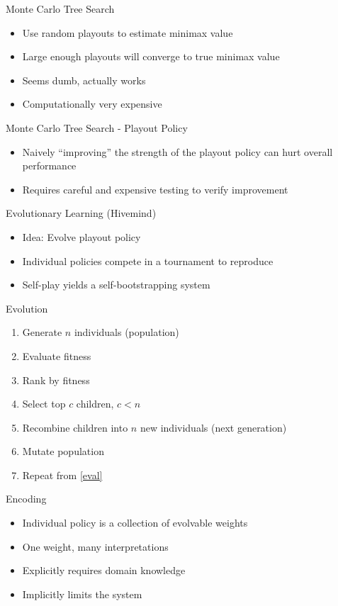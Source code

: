 \documentclass{beamer}
\begin{document}
\begin{frame}{Monte Carlo Tree Search}
\begin{itemize}
	\item Use random playouts to estimate minimax value
	\item Large enough playouts will converge to true minimax value
	\item Seems dumb, actually works
	\item Computationally very expensive
\end{itemize}
\end{frame}

\begin{frame}{Monte Carlo Tree Search - Playout Policy}
\begin{itemize}
	\item Naively ``improving'' the strength of the playout policy can hurt overall performance
	\item Requires careful and expensive testing to verify improvement
\end{itemize}
\end{frame}

\begin{frame}{Evolutionary Learning (Hivemind)}
\begin{itemize}
	\item Idea: Evolve playout policy
	\item Individual policies compete in a tournament to reproduce
	\item Self-play yields a self-bootstrapping system
\end{itemize}
\end{frame}

\begin{frame}{Evolution}
\begin{enumerate}
	\item Generate $n$ individuals (population)
	\item Evaluate fitness\label{eval}
	\item Rank by fitness
	\item Select top $c$ children, $c < n$
	\item Recombine children into $n$ new individuals (next generation)
	\item Mutate population
	\item Repeat from \ref{eval}
\end{enumerate}
\end{frame}

\begin{frame}{Encoding}
\begin{itemize}
	\item Individual policy is a collection of evolvable weights
	\item One weight, many interpretations
	\item Explicitly requires domain knowledge
	\item Implicitly limits the system
\end{itemize}
\end{frame}
\end{document}
